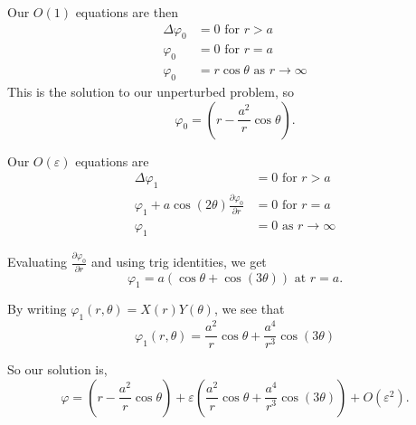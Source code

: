 \documentclass[a4paper]{article}
\begin{document}
\begin{enumerate}
  Our $O(1)$ equations are then
  \begin{align*}
    \Delta \varphi_0 &= 0 \text{ for } r > a \\
    \varphi_0 &= 0 \text{ for } r=a \\
    \varphi_0 &= r \cos \theta \text{ as } r \to \infty
  \end{align*}
  This is the solution to our unperturbed problem, so 
  \[ \varphi_0 = \left( r - \frac{a^2}{r} \cos \theta \right). \]

  Our $O(\varepsilon)$ equations are
  \begin{align*}
    \Delta \varphi_1 &= 0 \text{ for } r > a \\
    \varphi_1 + a \cos(2\theta) \frac{\partial\varphi_0}{\partial r} &=0 \text{ for } r=a \\
    \varphi_1 &= 0 \text{ as } r \to \infty
  \end{align*}

  Evaluating $\frac{\partial \varphi_0}{\partial r}$ and using trig identities, we get
  \[ \varphi_1 = a ( \cos \theta + \cos(3\theta) ) \text{ at } r=a .\]

  By writing $\varphi_1(r, \theta) = X(r) Y(\theta)$, we see that
  \[ \varphi_1(r, \theta) = \frac{a^2}{r} \cos\theta + \frac{a^4}{r^3} \cos(3\theta)\] 

  So our solution is, 
  \[ \varphi = \left(r - \frac{a^2}{r} \cos\theta \right) + \varepsilon \left( \frac{a^2}{r} \cos\theta + \frac{a^4}{r^3} \cos(3\theta) \right) + O(\varepsilon^2) .\]

\end{enumerate}
\end{document}
